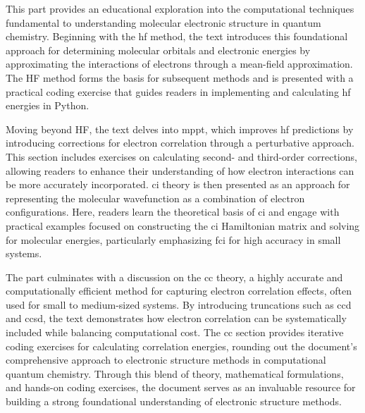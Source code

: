 This part provides an educational exploration into the computational techniques fundamental to understanding molecular electronic structure in quantum chemistry. Beginning with the \acrfull{hf} method, the text introduces this foundational approach for determining molecular orbitals and electronic energies by approximating the interactions of electrons through a mean-field approximation. The HF method forms the basis for subsequent methods and is presented with a practical coding exercise that guides readers in implementing and calculating \acrshort{hf} energies in Python.

Moving beyond HF, the text delves into \acrfull{mppt}, which improves \acrshort{hf} predictions by introducing corrections for electron correlation through a perturbative approach. This section includes exercises on calculating second- and third-order corrections, allowing readers to enhance their understanding of how electron interactions can be more accurately incorporated. \acrfull{ci} theory is then presented as an approach for representing the molecular wavefunction as a combination of electron configurations. Here, readers learn the theoretical basis of \acrshort{ci} and engage with practical examples focused on constructing the \acrshort{ci} Hamiltonian matrix and solving for molecular energies, particularly emphasizing \acrfull{fci} for high accuracy in small systems.

The part culminates with a discussion on the \acrfull{cc} theory, a highly accurate and computationally efficient method for capturing electron correlation effects, often used for small to medium-sized systems. By introducing truncations such as \acrfull{ccd} and \acrfull{ccsd}, the text demonstrates how electron correlation can be systematically included while balancing computational cost. The \acrshort{cc} section provides iterative coding exercises for calculating correlation energies, rounding out the document's comprehensive approach to electronic structure methods in computational quantum chemistry. Through this blend of theory, mathematical formulations, and hands-on coding exercises, the document serves as an invaluable resource for building a strong foundational understanding of electronic structure methods.